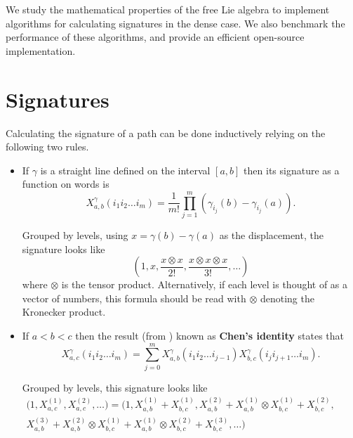 We study the mathematical properties of the free Lie algebra to implement algorithms for calculating signatures in the dense case. We also benchmark the performance of these algorithms, and provide an efficient open-source implementation.
\fi


\section{Signatures}\label{sec:sigs}

Calculating the signature of a path can be done inductively relying on the following two rules.
\begin{itemize}
	\item If $\gamma$ is a straight line defined on the interval $[a,b]$ then its signature as a function on words is \begin{equation}X^\gamma_{a,b}(i_1i_2\ldots i_m)=\frac1{m!}\prod_{j=1}^m(\gamma_{i_j}(b)-\gamma_{i_j}(a))\label{eq:straightsig}.\end{equation} 
	
	Grouped by levels, using $x=\gamma(b)-\gamma(a)$ as the displacement, the signature looks like
	\begin{equation}
	\left(1,x,\frac{x\otimes x}{2!},\frac{x\otimes x\otimes x}{3!},\dots\right)
	\end{equation}
	where $\otimes$ is the tensor product. Alternatively, if each level is thought of as a vector of numbers, this formula should be read with $\otimes$ denoting the Kronecker product.
	\item If $a<b<c$ then the result (from \cite{chen}) known as \textbf{Chen's identity} states that \begin{equation}
	X^\gamma_{a,c}(i_1i_2\ldots i_m) %
	=\sum_{j=0}^mX^\gamma_{a,b}(i_1i_2\ldots i_{j-1})X^\gamma_{b,c}(i_ji_{j+1}\ldots i_m).\label{eq:chen}
	\end{equation}
	
	Grouped by levels, this signature looks like
	\begin{align}
	\Big(1,X^{(1)}_{a,c},X^{(2)}_{a,c},\dots\Big)=\Big(1,X^{(1)}_{a,b}+X^{(1)}_{b,c},X^{(2)}_{a,b}+X^{(1)}_{a,b}\otimes X^{(1)}_{b,c}+X^{(2)}_{b,c},\qquad\qquad\\ X^{(3)}_{a,b}+X^{(2)}_{a,b}\otimes X^{(1)}_{b,c}+X^{(1)}_{a,b}\otimes X^{(2)}_{b,c}+X^{(3)}_{b,c},\dots\Big)\nonumber
	\end{align}
	
\end{itemize}

